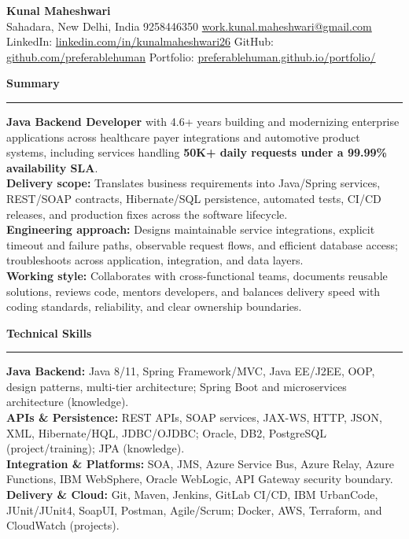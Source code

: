 \documentclass[11pt,letterpaper]{article}
\newcommand{\ressection}[1]{\Needspace{6\baselineskip}\vspace{8pt}\par\textbf{#1}\par\vspace{2pt}\hrule\vspace{5pt}}
\begin{document}
\pagestyle{empty}\raggedright\fontsize{11}{12.5}\selectfont

{\Large \textbf{Kunal Maheshwari}}\\
Sahadara, New Delhi, India \textbar{} 9258446350 \textbar{} \href{mailto:work.kunal.maheshwari@gmail.com}{work.kunal.maheshwari@gmail.com}\\
LinkedIn: \href{https://www.linkedin.com/in/kunalmaheshwari26}{linkedin.com/in/kunalmaheshwari26} \textbar{} GitHub: \href{https://github.com/preferablehuman}{github.com/preferablehuman} \textbar{} Portfolio: \href{https://preferablehuman.github.io/portfolio/}{preferablehuman.github.io/portfolio/}

\ressection{Summary}
\textbf{Java Backend Developer} with 4.6+ years building and modernizing enterprise applications across healthcare payer integrations and automotive product systems, including services handling \textbf{50K+ daily requests under a 99.99\% availability SLA}.\\[2pt]
\textbf{Delivery scope:} Translates business requirements into Java/Spring services, REST/SOAP contracts, Hibernate/SQL persistence, automated tests, CI/CD releases, and production fixes across the software lifecycle.\\[2pt]
\textbf{Engineering approach:} Designs maintainable service integrations, explicit timeout and failure paths, observable request flows, and efficient database access; troubleshoots across application, integration, and data layers.\\[2pt]
\textbf{Working style:} Collaborates with cross-functional teams, documents reusable solutions, reviews code, mentors developers, and balances delivery speed with coding standards, reliability, and clear ownership boundaries.

\ressection{Technical Skills}
\textbf{Java Backend:} Java 8/11, Spring Framework/MVC, Java EE/J2EE, OOP, design patterns, multi-tier architecture; Spring Boot and microservices architecture (knowledge).\\
\textbf{APIs \& Persistence:} REST APIs, SOAP services, JAX-WS, HTTP, JSON, XML, Hibernate/HQL, JDBC/OJDBC; Oracle, DB2, PostgreSQL (project/training); JPA (knowledge).\\
\textbf{Integration \& Platforms:} SOA, JMS, Azure Service Bus, Azure Relay, Azure Functions, IBM WebSphere, Oracle WebLogic, API Gateway security boundary.\\
\textbf{Delivery \& Cloud:} Git, Maven, Jenkins, GitLab CI/CD, IBM UrbanCode, JUnit/JUnit4, SoapUI, Postman, Agile/Scrum; Docker, AWS, Terraform, and CloudWatch (projects).
\end{document}
